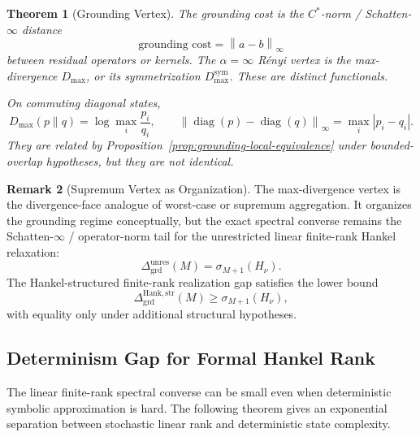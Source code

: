 \documentclass[12pt]{article}
\newtheorem{theorem}{Theorem}[section]
\theoremstyle{definition}
\newtheorem{remark}[theorem]{Remark}
\newcommand{\norm}[1]{\left\lVert#1\right\rVert}
\newcommand{\Dunres}{\Delta_{\mathrm{grd}}^{\mathrm{unres}}}
\newcommand{\DHankstr}{\Delta_{\mathrm{grd}}^{\mathrm{Hank,str}}}
\newcommand{\Dmax}{D_{\max}}
\newcommand{\Dmaxsym}{D_{\max}^{\mathrm{sym}}}
\begin{document}
\begin{theorem}[Grounding Vertex]
\label{thm:grounding-vertex}
The grounding cost is the $C^*$-norm / Schatten-$\infty$ distance
\[
\text{grounding cost}
=
\norm{a-b}_\infty
\]
between residual operators or kernels.  The $\alpha=\infty$ R\'enyi vertex is
the max-divergence $\Dmax$, or its symmetrization $\Dmaxsym$.  These are
distinct functionals.

On commuting diagonal states,
\[
\Dmax(p\|q)
=
\log\max_i\frac{p_i}{q_i},
\qquad
\norm{\operatorname{diag}(p)-\operatorname{diag}(q)}_\infty
=
\max_i|p_i-q_i|.
\]
They are related by Proposition~\ref{prop:grounding-local-equivalence} under
bounded-overlap hypotheses, but they are not identical.
\end{theorem}

\begin{remark}[Supremum Vertex as Organization]
\label{rem:grounding-supremum-organization}
The max-divergence vertex is the divergence-face analogue of worst-case or
supremum aggregation.  It organizes the grounding regime conceptually, but the
exact spectral converse remains the Schatten-$\infty$ / operator-norm tail for
the unrestricted linear finite-rank Hankel relaxation:
\[
\Dunres(M)
=
\sigma_{M+1}(H_\nu).
\]
The Hankel-structured finite-rank realization gap satisfies the lower bound
\[
\DHankstr(M)
\ge
\sigma_{M+1}(H_\nu),
\]
with equality only under additional structural hypotheses.
\end{remark}

\subsection{Determinism Gap for Formal Hankel Rank}
\label{subsec:exp-determinism}

The linear finite-rank spectral converse can be small even when deterministic
symbolic approximation is hard.  The following theorem gives an exponential
separation between stochastic linear rank and deterministic state complexity.
\end{document}
